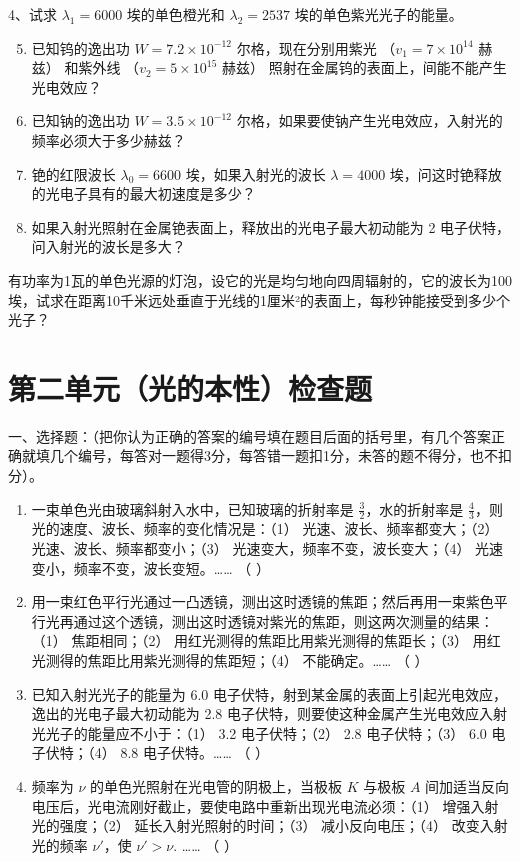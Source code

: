 4、试求 \(\lambda_{1}=6000\) 埃的单色橙光和 \(\lambda_{2}=2537\)
埃的单色紫光光子的能量。

\begin{enumerate}
\setcounter{enumi}{4}
\item
  已知钨的逸出功 \(W = 7.2 \times 10^{-12}\) 尔格，现在分别用紫光
  （\(v_1 = 7 \times 10^{14}\) 赫兹） 和紫外线
  （\(v_2 = 5 \times 10^{15}\) 赫兹）
  照射在金属钨的表面上，间能不能产生光电效应？
\item
  已知钠的逸出功 \(W = 3.5 \times 10^{-12}\)
  尔格，如果要使钠产生光电效应，入射光的频率必须大于多少赫兹？
\item
  铯的红限波长 \(\lambda_{0}=6600\) 埃，如果入射光的波长
  \(\lambda=4000\) 埃，问这时铯释放的光电子具有的最大初速度是多少？
\item
  如果入射光照射在金属铯表面上，释放出的光电子最大初动能为 2
  电子伏特，问入射光的波长是多大？
\end{enumerate}

有功率为1瓦的单色光源的灯泡，设它的光是均匀地向四周辐射的，它的波长为100埃，试求在距离10千米远处垂直于光线的1厘米²的表面上，每秒钟能接受到多少个光子？

\chapter{第二单元（光的本性）检查题}

一、选择题：（把你认为正确的答案的编号填在题目后面的括号里，有几个答案正确就填几个编号，每答对一题得3分，每答错一题扣1分，未答的题不得分，也不扣分）。

\begin{enumerate}
\item
  一束单色光由玻璃斜射入水中，已知玻璃的折射率是
  \(\frac{3}{2}\)，水的折射率是
  \(\frac{4}{3}\)，则光的速度、波长、频率的变化情况是：（1）
  光速、波长、频率都变大；（2） 光速、波长、频率都变小；（3）
  光速变大，频率不变，波长变大；（4）
  光速变小，频率不变，波长变短。\ldots\ldots{} （ ）
\item
  用一束红色平行光通过一凸透镜，测出这时透镜的焦距；然后再用一束紫色平行光再通过这个透镜，测出这时透镜对紫光的焦距，则这两次测量的结果：（1）
  焦距相同；（2） 用红光测得的焦距比用紫光测得的焦距长；（3）
  用红光测得的焦距比用紫光测得的焦距短；（4） 不能确定。\ldots\ldots{}
  （ ）
\item
  已知入射光光子的能量为 6.0
  电子伏特，射到某金属的表面上引起光电效应，逸出的光电子最大初动能为 2.8
  电子伏特，则要使这种金属产生光电效应入射光光子的能量应不小于：（1）
  3.2 电子伏特；（2） 2.8 电子伏特；（3） 6.0 电子伏特；（4） 8.8
  电子伏特。\ldots\ldots{} （ ）
\item
  频率为 \(\nu\) 的单色光照射在光电管的阴极上，当极板 \(K\) 与极板 \(A\)
  间加适当反向电压后，光电流刚好截止，要使电路中重新出现光电流必须：（1）
  增强入射光的强度；（2） 延长入射光照射的时间；（3）
  减小反向电压；（4） 改变入射光的频率 \(\nu'\)，使 \(\nu' > \nu\).
  \ldots\ldots{} （ ）
\end{enumerate}

